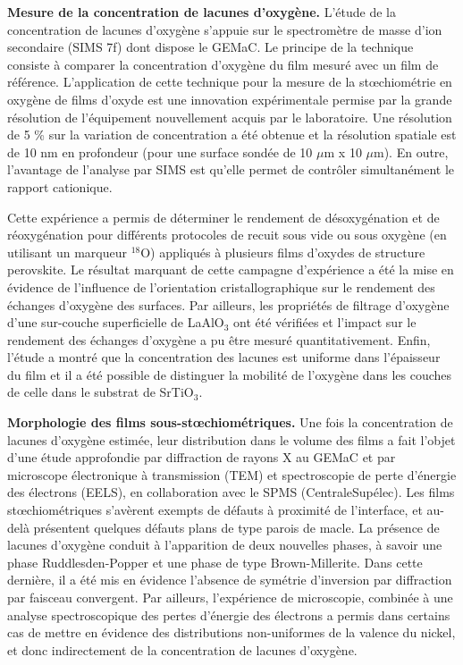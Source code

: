 \textbf{Mesure de la concentration de lacunes d'oxygène.}
L'étude de la concentration de lacunes d'oxygène s'appuie sur le spectromètre de masse d'ion secondaire (SIMS 7f) dont dispose le GEMaC. Le principe de la technique consiste à comparer la concentration d'oxygène du film mesuré avec un film de référence. L'application de cette technique pour la mesure de la st\oe chiométrie en oxygène de films d'oxyde est une innovation expérimentale permise par la grande résolution de l'équipement nouvellement acquis par le laboratoire. Une résolution de 5 \%  sur la variation de concentration a été obtenue et la résolution spatiale est de 10 nm en profondeur (pour une surface sondée de 10 $\mu$m x 10 $\mu$m).
En outre, l'avantage de l'analyse par SIMS est qu'elle permet de contrôler simultanément le rapport cationique.

Cette expérience a permis de déterminer le rendement de désoxygénation et de réoxygénation pour différents  protocoles de recuit sous vide ou sous oxygène (en utilisant un marqueur ${}^{18}$O) appliqués à plusieurs films d'oxydes de structure perovskite.
Le résultat marquant de cette campagne d'expérience a été la mise en évidence de l'influence de l'orientation cristallographique sur le rendement des échanges d'oxygène des surfaces.
Par ailleurs, les propriétés de filtrage d'oxygène d'une sur-couche superficielle de LaAlO$_3$ ont été vérifiées et l'impact sur le rendement des échanges d'oxygène a pu être mesuré quantitativement.
Enfin, l'étude a montré que la concentration des lacunes est uniforme dans l'épaisseur du film et il a été possible de distinguer la mobilité de l'oxygène dans les couches de celle dans le substrat de SrTiO$_3$.

\textbf{Morphologie des films sous-st\oe chiométriques.}
Une fois la concentration de lacunes d'oxygène estimée, leur distribution dans le volume des films a fait l'objet d'une étude approfondie par diffraction de rayons X au GEMaC et par microscope électronique à transmission (TEM) et spectroscopie de perte d'énergie des électrons (EELS), en collaboration avec le SPMS (CentraleSupélec).
Les films st\oe chiométriques s'avèrent exempts de défauts à proximité de l'interface, et au-delà présentent quelques défauts plans de type parois de macle.
La présence de lacunes d'oxygène  conduit à l'apparition de deux nouvelles phases, à savoir une phase Ruddlesden-Popper et une phase de type Brown-Millerite.
Dans cette dernière, il a été mis en évidence l'absence de symétrie d'inversion par diffraction par faisceau convergent.
Par ailleurs, l'expérience de microscopie, combinée à une analyse spectroscopique des pertes d'énergie des électrons a permis dans certains cas de mettre en évidence des distributions non-uniformes de la valence du nickel, et donc indirectement de la concentration de lacunes d'oxygène.

